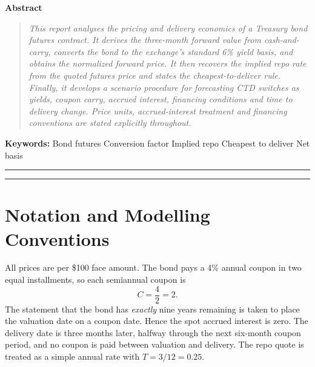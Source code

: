 \documentclass[11pt]{article}
\numberwithin{equation}{section}
\begin{document}
\begin{center}
{\sffamily\large\bfseries\color{NYUviolet}Abstract}
\end{center}
\begin{quote}
\small\itshape
This report analyses the pricing and delivery economics of a Treasury bond
futures contract. It derives the three-month forward value from cash-and-carry,
converts the bond to the exchange's standard 6\% yield basis, and obtains the
normalized forward price. It then recovers the implied repo rate from the
quoted futures price and states the cheapest-to-deliver rule. Finally, it
develops a scenario procedure for forecasting CTD switches as yields, coupon
carry, accrued interest, financing conditions and time to delivery change.
Price units, accrued-interest treatment and financing conventions are stated
explicitly throughout.
\end{quote}
\vspace{4pt}
{\small\noindent\textbf{\sffamily Keywords:}\;
Bond futures \textbullet\; Conversion factor \textbullet\; Implied repo
\textbullet\; Cheapest to deliver \textbullet\; Net basis}
\vspace{8pt}
{\color{rulegrey}\hrule}
\setcounter{tocdepth}{1}
\renewcommand{\contentsname}{\sffamily\large\bfseries\color{NYUviolet}Contents}
{\small\tableofcontents}
{\color{rulegrey}\hrule}
\clearpage

\section*{Notation and Modelling Conventions}

All prices are per \$100 face amount. The bond pays a 4\% annual coupon in two
equal installments, so each semiannual coupon is
\[
C=\frac{4}{2}=2.
\]
The statement that the bond has \emph{exactly} nine years remaining is taken to
place the valuation date on a coupon date. Hence the spot accrued interest is
zero. The delivery date is three months later, halfway through the next
six-month coupon period, and no coupon is paid between valuation and delivery.
The repo quote is treated as a simple annual rate with $T=3/12=0.25$.
\end{document}
